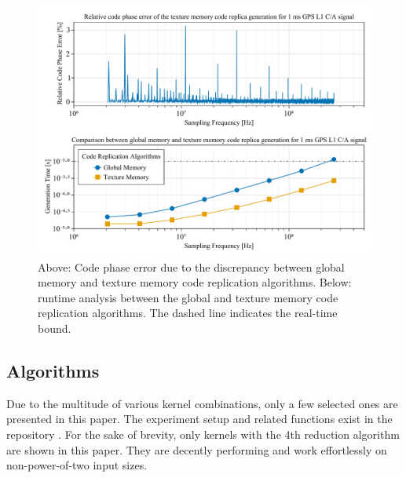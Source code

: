 \documentclass{juliacon}
\begin{document}
\begin{figure}
  \centering
  \includegraphics[scale = 0.6]{code_phase.pdf}
  \caption{\label{fig:code-phase}Above: Code phase error due to the discrepancy between global memory and texture memory code replication algorithms. Below: runtime analysis between the global and texture memory code replication algorithms. The dashed line indicates the real-time bound.}
\end{figure}

\subsection*{Algorithms}
Due to the multitude of various kernel combinations, only a few selected ones are presented in this paper. The experiment setup and related functions exist in the repository \cite{Ozmaden2022}. For the sake of brevity, only kernels with the 4th reduction algorithm are shown in this paper. They are decently performing and work effortlessly on non-power-of-two input sizes. 
\end{document}
